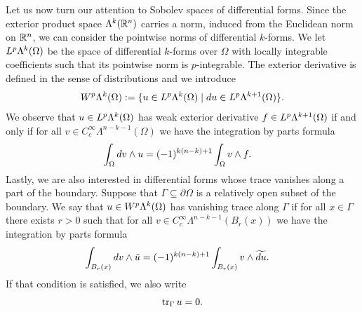 \documentclass[10pt,a4paper]{article}
\newcommand{\todo}[1]{{\colorbox{yellow}{#1}}}
\newcommand\cye[1]{%
\protect\leavevmode
\begingroup
    \color{blue}%
    #1%
\endgroup
}
\newcommand{\mwl}[1]{{\color{red}#1}}
\begin{document}
Let us now turn our attention to Sobolev spaces of differential forms. 
Since the exterior product space $\Lambda^{k}({\mathbb R}^{n})$ carries a norm, induced from the Euclidean norm on ${\mathbb R}^{n}$, we can consider the pointwise norms of differential $k$-forms. 
We let $L^{p}\Lambda^{k}(\Omega)$ be the space of differential $k$-forms over $\Omega$ with locally integrable coefficients 
such that its pointwise norm is $p$-integrable. 
The exterior derivative is defined in the sense of distributions and we introduce 
\begin{gather*}
    W^{p}\Alt^{k}(\Omega) 
    := 
    \{ u \in L^{p}\Alt^{k}(\Omega) \suchthat \cartan u \in L^{p}\Alt^{k+1}(\Omega) \}
    .
\end{gather*}
We observe that $u \in L^{p}\Lambda^{k}(\Omega)$ has weak exterior derivative $f \in L^{p}\Lambda^{k+1}(\Omega)$
if and only if for all $v \in C^{\infty}_{c}\Lambda^{n-k-1}(\Omega)$ we have the integration by parts formula
\begin{align*}
    \int_{\Omega} d v \wedge u
    &=
    (-1)^{k(n-k)+1}
    \int_{\Omega} v \wedge f 
    .
\end{align*}
Lastly, we are also interested in differential forms whose trace vanishes along a part of the boundary. 
Suppose that $\Gamma \subseteq \partial\Omega$ is a relatively open subset of the boundary. 
We say that $u \in W^{p}\Lambda^{k}(\Omega)$ has vanishing trace along $\Gamma$ if for all $x \in \Gamma$ there exists $r > 0$
such that for all $v \in C^{\infty}_{c}\Lambda^{n-k-1}(B_r(x))$ we have the integration by parts formula
\begin{align*}
    \int_{B_r(x)} d v \wedge \tilde u
    &=
    (-1)^{k(n-k)+1}
    \int_{B_r(x)} v \wedge \widetilde{d u}
    .
\end{align*}
If that condition is satisfied, we also write 
\begin{align*}
    \operatorname{tr}_{\Gamma} u = 0
    .
\end{align*}
\end{document}
